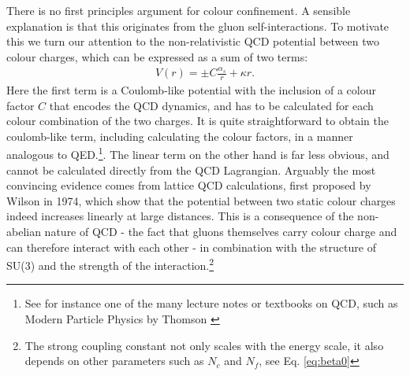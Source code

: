     There is no first principles argument for colour confinement. A sensible explanation is that this originates %
    from the gluon self-interactions. To motivate this we turn our attention to the non-relativistic QCD potential between two colour charges, which can be expressed as a sum of two terms:
    \begin{align}
      V(r) = \pm C \frac{\alpha_s}{r} + \kappa r. \label{eq:qcdpotential}
    \end{align}
    Here the first term is a Coulomb-like potential with the inclusion of a colour factor $C$ that encodes the QCD dynamics, and has to be calculated for each colour combination of the two charges. It is quite straightforward to obtain the coulomb-like term, including calculating the colour factors, in a manner analogous to QED.\footnote{See for instance one of the many lecture notes or textbooks on QCD, such as Modern Particle Physics by Thomson \cite{ThomsonMPP}}. 
    The linear term on the other hand is far less obvious, and cannot be calculated directly from the QCD Lagrangian. Arguably the most convincing evidence comes from lattice QCD calculations, first proposed by Wilson \cite{Wilson1974} in 1974, which show that the potential between two static colour charges indeed increases linearly at large distances. This is a consequence of the non-abelian nature of QCD - the fact that gluons themselves carry colour charge and can therefore interact with each other - in combination with the structure of SU(3) and the strength of the interaction.\footnote{The strong coupling constant not only scales with the energy scale, it also depends on other parameters such as $N_c$ and $N_f$, see Eq. \ref{eq:beta0}} %

